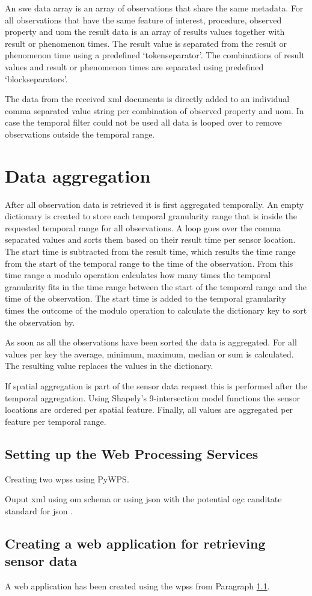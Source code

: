 An \ac{swe} data array is an array of observations that share the same metadata. For all observations that have the same feature of interest, procedure, observed property and \ac{uom} the result data is an array of  results values together with result or phenomenon times. The result value is separated from the result or phenomenon time using a predefined `tokenseparator'. The combinations of result values and result or phenomenon times are separated using predefined `blockseparators'.  

The data from the received \ac{xml} documents is directly added to an individual comma separated value string per combination of observed property and \ac{uom}. In case the temporal filter could not be used all data is looped over to remove observations outside the temporal range. 

\section{Data aggregation}
After all observation data is retrieved it is first aggregated temporally. An empty dictionary is created to store each temporal granularity range that is inside the requested temporal range for all observations. A loop goes over the comma separated values and sorts them based on their result time per sensor location. The start time is subtracted from the result time, which results the time range from the start of the temporal range to the time of the observation. From this time range a modulo operation calculates how many times the temporal granularity fits in the time range between the start of the temporal range and the time of the observation. The start time is added to the temporal granularity times the outcome of the modulo operation to calculate the dictionary key to sort the observation by.

As soon as all the observations have been sorted the data is aggregated. For all values per key the average, minimum, maximum, median or sum is calculated. The resulting value replaces the values in the dictionary. 

If spatial aggregation is part of the sensor data request this is performed after the temporal aggregation. Using Shapely's 9-intersection model functions the sensor locations are ordered per spatial feature. Finally, all values are aggregated per feature per temporal range.          

\subsection{Setting up the Web Processing Services}
\label{impl:wps}
Creating two \aclp{wps} using PyWPS.

Ouput \ac{xml} using \ac{om} schema or using \ac{json} with the potential \ac{ogc} canditate standard for \ac{json} \citep{SW:OGC6}.

\subsection{Creating a web application for retrieving sensor data}
A web application has been created using the \aclp{wps} from Paragraph \ref{impl:wps}.
